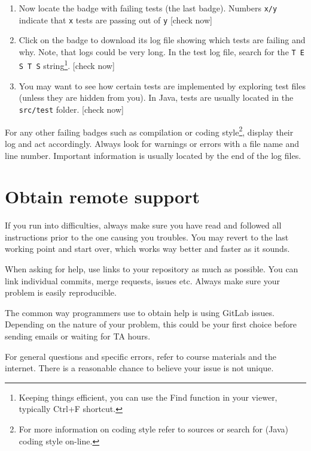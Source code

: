 \begin{enumerate}
\item
  {Now locate the badge with failing tests (the last badge). Numbers \texttt{x/y} indicate that \texttt{x} tests are passing out of \texttt{y} {[}check now{]}}
\item
  {Click on the badge to download its log file showing which tests are failing and why. Note, that logs could be very long. In the test log file, search for the \texttt{T E S T S} string\footnote{Keeping things efficient, you can use the Find function in your viewer, typically Ctrl+F shortcut.}. {[}check now{]}}
\item
  {You may want to see how certain tests are implemented by exploring test files (unless they are hidden from you). In Java, tests are usually located in the \texttt{src/test} folder. {[}check now{]}}
\end{enumerate}

{For any other failing badges such as compilation or coding style\footnote{For more information on coding style refer to sources or search for (Java) coding style on-line.}, display their log and act accordingly. Always look for warnings or errors with a file name and line number. Important information is usually located by the end of the log files.}

\section{Obtain remote support}\label{sec:obtaionremsup}

{If you run into difficulties, always make sure you have read and followed all instructions prior to the one causing you troubles. You may revert to the last working point and start over, which works way better and faster as it sounds.}

{When asking for help, use links to your repository as much as possible. You can link individual commits, merge requests, issues etc. Always make sure your problem is easily reproducible.}

{The common way programmers use to obtain help is using GitLab issues. Depending on the nature of your problem, this could be your first choice before sending emails or waiting for TA hours.}

{For general questions and specific errors, refer to course materials and the internet. There is a reasonable chance to believe your issue is not unique.}
